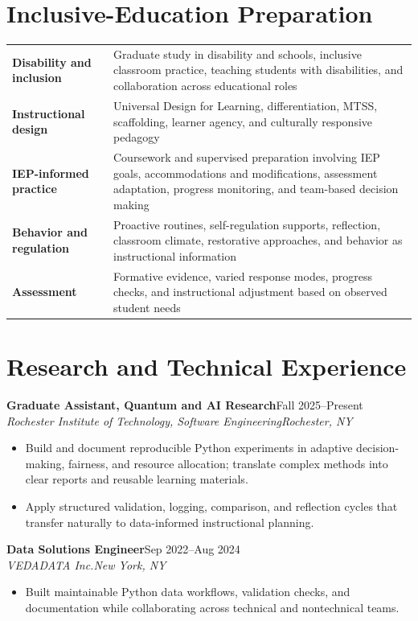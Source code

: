 \documentclass[10pt,letterpaper]{article}
\newcommand{\role}[4]{%
  \textbf{#1}\hfill #2\\
  \textit{#3}\hfill \textit{#4}\vspace{-3pt}
}
\begin{document}
\section*{Inclusive-Education Preparation}
\begin{tabularx}{\textwidth}{@{}>{\bfseries}l X@{}}
Disability and inclusion & Graduate study in disability and schools, inclusive classroom practice, teaching students with disabilities, and collaboration across educational roles\\
Instructional design & Universal Design for Learning, differentiation, MTSS, scaffolding, learner agency, and culturally responsive pedagogy\\
IEP-informed practice & Coursework and supervised preparation involving IEP goals, accommodations and modifications, assessment adaptation, progress monitoring, and team-based decision making\\
Behavior and regulation & Proactive routines, self-regulation supports, reflection, classroom climate, restorative approaches, and behavior as instructional information\\
Assessment & Formative evidence, varied response modes, progress checks, and instructional adjustment based on observed student needs\\
\end{tabularx}

\section*{Research and Technical Experience}
\role{Graduate Assistant, Quantum and AI Research}{Fall 2025--Present}
{Rochester Institute of Technology, Software Engineering}{Rochester, NY}
\begin{itemize}
  \item Build and document reproducible Python experiments in adaptive
    decision-making, fairness, and resource allocation; translate complex
    methods into clear reports and reusable learning materials.
  \item Apply structured validation, logging, comparison, and reflection cycles
    that transfer naturally to data-informed instructional planning.
\end{itemize}

\role{Data Solutions Engineer}{Sep 2022--Aug 2024}
{VEDADATA Inc.}{New York, NY}
\begin{itemize}
  \item Built maintainable Python data workflows, validation checks, and
    documentation while collaborating across technical and nontechnical teams.
\end{itemize}
\end{document}
